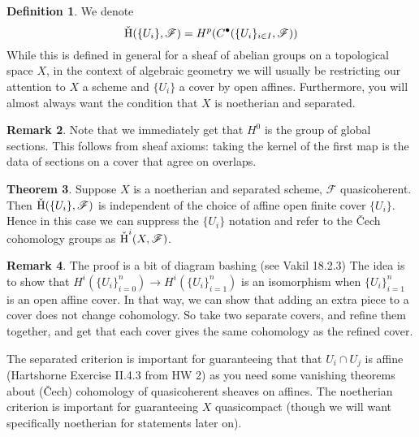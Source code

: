 \documentclass[10pt,reqno]{amsart}
\theoremstyle{definition}
\newtheorem{theorem}{Theorem}
\newtheorem{definition}[theorem]{Definition}
\newtheorem{remark}[theorem]{Remark}
\theoremstyle{remark}
\numberwithin{equation}{section}
\numberwithin{theorem}{section}
\newcommand{\FF}{{\mathscr F}}
\newcommand{\vH}{\textup{\v H}}
\begin{document}
\begin{definition} We denote
\[ \textup{\v H}(\{U_i\}, \FF) = H^p(C^{\bullet}(\{U_i\}_{i \in I}, \FF))\]
While this is defined in general for a sheaf of abelian groups on a topological space $X$, in the context of algebraic geometry we will usually be restricting our attention to $X$ a scheme and $\{U_i\}$ a cover by open affines. Furthermore, you will almost always want the condition that $X$ is noetherian and separated.
\end{definition}

\begin{remark} Note that we immediately get that $H^0$ is the group of global sections. This follows from sheaf axioms: taking the kernel of the first map is the data of sections on a cover that agree on overlaps.
\end{remark}

\begin{theorem} Suppose $X$ is a noetherian and separated scheme, $\FF$ quasicoherent. Then $\vH(\{U_i\},\FF)$ is independent of the choice of affine open finite cover $\{U_i\}$. Hence in this case we can suppress the $\{U_i\}$ notation and refer to the \v Cech cohomology groups as $\vH^i(X,\FF)$.
\end{theorem}

\begin{remark} The proof is a bit of diagram bashing (see Vakil 18.2.3) The idea is to show that $H^i(\{U_i\}_{i=0}^n) \to H^i(\{U_i\}_{i=1}^n)$ is an isomorphism when $\{U_i\}_{i=1}^n$ is an open affine cover. In that way, we can show that adding an extra piece to a cover does not change cohomology. So take two separate covers, and refine them together, and get that each cover gives the same cohomology as the refined cover.

The separated criterion is important for guaranteeing that that $U_i \cap U_j$ is affine (Hartshorne Exercise II.4.3 from HW 2) as you need some vanishing theorems about (\v Cech) cohomology of quasicoherent sheaves on affines. The noetherian criterion is important for guaranteeing $X$ quasicompact (though we will want specifically noetherian for statements later on).
\end{remark}
\end{document}
